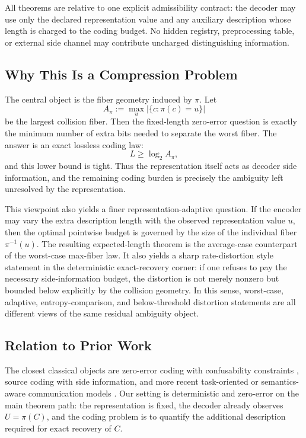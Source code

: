 All theorems are relative to one explicit admissibility contract: the decoder may use only the declared representation value and any auxiliary description whose length is charged to the coding budget. No hidden registry, preprocessing table, or external side channel may contribute uncharged distinguishing information.

\subsection{Why This Is a Compression Problem}

The central object is the fiber geometry induced by $\pi$. Let
\[
A_\pi := \max_u |\{c : \pi(c)=u\}|
\]
be the largest collision fiber. Then the fixed-length zero-error question is exactly the minimum number of extra bits needed to separate the worst fiber. The answer is an exact lossless coding law:
\[
L \ge \log_2 A_\pi,
\]
and this lower bound is tight. Thus the representation itself acts as decoder side information, and the remaining coding burden is precisely the ambiguity left unresolved by the representation.

This viewpoint also yields a finer representation-adaptive question. If the encoder may vary the extra description length with the observed representation value $u$, then the optimal pointwise budget is governed by the size of the individual fiber $\pi^{-1}(u)$. The resulting expected-length theorem is the average-case counterpart of the worst-case max-fiber law. It also yields a sharp rate-distortion style statement in the deterministic exact-recovery corner: if one refuses to pay the necessary side-information budget, the distortion is not merely nonzero but bounded below explicitly by the collision geometry. In this sense, worst-case, adaptive, entropy-comparison, and below-threshold distortion statements are all different views of the same residual ambiguity object.

\subsection{Relation to Prior Work}

The closest classical objects are zero-error coding with confusability constraints \cite{korner1973coding, witsenhausen1976zero}, source coding with side information, and more recent task-oriented or semantics-aware communication models \cite{gunduz2023beyond}. Our setting is deterministic and zero-error on the main theorem path: the representation is fixed, the decoder already observes $U=\pi(C)$, and the coding problem is to quantify the additional description required for exact recovery of $C$.

